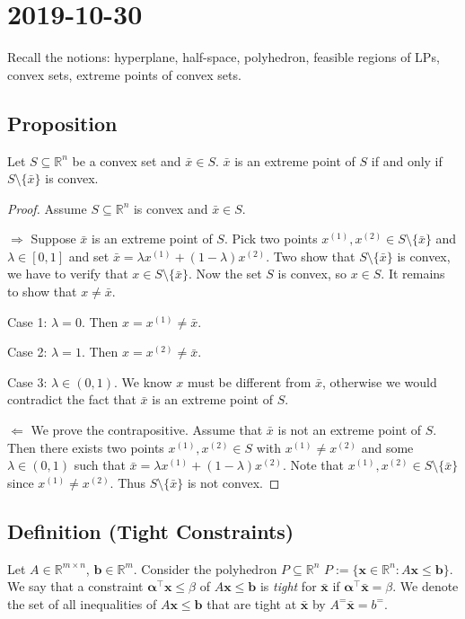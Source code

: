 \section{2019-10-30}
Recall the notions: hyperplane, half-space, polyhedron,
feasible regions of LPs, convex sets, extreme points
of convex sets.

\begin{thmbox}
    \subsection{Proposition}
    Let $ S\subseteq \mathbb{R}^n $ be a convex set and $ \bar{x}\in S $. 
    $ \bar{x} $ is an extreme point of $ S $ if and only if
    $ S\setminus \{\bar{x}\} $ is convex.
\end{thmbox}
\begin{proof}
    Assume $ S\subseteq\mathbb{R}^n $ is convex and $ \bar{x}\in S $.

    $\Rightarrow$
    Suppose $ \bar{x} $ is an extreme point of $ S $. Pick two points
    $ x^{(1)},x^{(2)}\in S\setminus\{\bar{x}\} $ and $ \lambda\in[0,1] $
    and set $\bar{x}=\lambda x^{(1)} + (1-\lambda)x^{(2)}$. Two show
    that $ S\setminus\{\bar{x}\} $ is convex, we have to verify that $ x\in S\setminus\{\bar{x}\} $.
    Now the set $ S $ is convex, so $ x\in S $. It remains to show that
    $ x\neq \bar{x} $.

    Case 1: $ \lambda =0 $. Then $ x=x^{(1)}\neq \bar{x} $.

    Case 2: $ \lambda =1 $. Then $ x=x^{(2)}\neq \bar{x} $.

    Case 3: $ \lambda\in(0,1) $. We know $ x $ must be different from
    $ \bar{x} $, otherwise we would contradict the fact that $ \bar{x} $ is
    an extreme point of $ S $.

    $ \Leftarrow $ We prove the contrapositive. Assume that $ \bar{x} $
    is not an extreme point of $ S $. Then there exists two points
    $ x^{(1)},x^{(2)}\in S $ with $ x^{(1)}\neq x^{(2)} $ and some
    $ \lambda\in(0,1) $ such that $\bar{x}=\lambda x^{(1)} + (1-\lambda)x^{(2)}$.
    Note that $ x^{(1)},x^{(2)}\in S\setminus\{\bar{x}\}$ since
    $ x^{(1)}\neq x^{(2)} $. Thus $ S\setminus\{\bar{x}\} $ is not convex.
\end{proof}

\begin{defbox}
    \subsection{Definition (Tight Constraints)}
    Let $ A\in \mathbb{R}^{m \times n} $, $ \bm{b}\in \mathbb{R}^m $. Consider
    the polyhedron $ P\subseteq \mathbb{R}^n $
    $ P:=\{\bm{x}\in\mathbb{R}^n:A\bm{x}\le \bm{b}\} $. We say
    that a constraint $ \bm{\alpha ^\top} \bm{x}\le \beta $ of
    $ A \bm{x}\le \bm{b} $ is \emph{tight} for $ \bm{\bar{x}} $ if
    $ \bm{\alpha}^\top \bm{\bar{x}}=\beta $. We denote the set of all
    inequalities of $ A \bm{x}\le \bm{b} $ that
    are tight at $ \bm{\bar{x}} $ by $ A^=\bm{\bar{x}}=b^= $.
\end{defbox}


